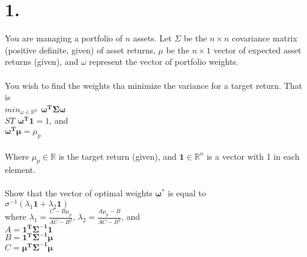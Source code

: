\documentclass{article}
\begin{document}
\thispagestyle{firstpageheader}

\section*{1.}
{\Large 

You are managing a portfolio of $n$ assets. Let $\Sigma$ be the $n \times n$ covariance matrix (positive definite, given) of asset returns, $\mu$ be the $n \times 1$ vector of expected asset returns (given), and $\omega$ represent the vector of portfolio weights. \\ \\
You wish to find the weights tha minimize the variance for a target return. That is \\
$min_{\omega \in \mathbb{R}^n }$ $\mathbf{\omega^T \Sigma \omega}$ \\
$ST$ $\mathbf{\omega^T1} = 1$, and \\
$\mathbf{\omega^T\mu} = \mu_p$ \\ \\
Where $\mu_p \in \mathbb{R}$ is the target return (given), and $\mathbf{1} \in \mathbb{R}^n$ is a vector with 1 in each element. \\ \\
Show that the vector of optimal weights $\mathbf{\omega}^*$ is equal to \\
$\sigma^{-1}(\lambda_1\mathbf{1} + \lambda_2\mathbf{1})$ \\
where $\lambda_1 = \frac{C - B\mu_p}{AC - B^2}$, $\lambda_2 = \frac{A\mu_p - B}{AC - B^2}$, and \\
$A = \mathbf{1^T\Sigma^{-1}1}$ \\
$B = \mathbf{1^T\Sigma^{-1}\mu}$ \\
$C = \mathbf{\mu^T\Sigma^{-1}\mu}$ \\



\newpage
}
\end{document}
